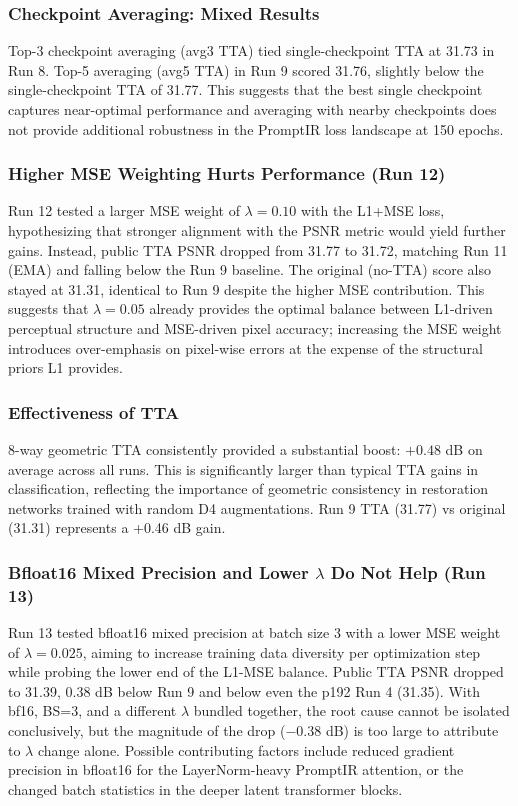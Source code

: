 \documentclass[12pt, a4paper]{article}
\begin{document}
\subsubsection{Checkpoint Averaging: Mixed Results}
Top-3 checkpoint averaging (avg3 TTA) tied single-checkpoint TTA at 31.73 in Run 8. Top-5 averaging (avg5 TTA) in Run 9 scored 31.76, slightly below the single-checkpoint TTA of 31.77. This suggests that the best single checkpoint captures near-optimal performance and averaging with nearby checkpoints does not provide additional robustness in the PromptIR loss landscape at 150 epochs.

\subsubsection{Higher MSE Weighting Hurts Performance (Run 12)}
Run 12 tested a larger MSE weight of $\lambda=0.10$ with the L1+MSE loss, hypothesizing that stronger alignment with the PSNR metric would yield further gains. Instead, public TTA PSNR dropped from 31.77 to 31.72, matching Run 11 (EMA) and falling below the Run 9 baseline. The original (no-TTA) score also stayed at 31.31, identical to Run 9 despite the higher MSE contribution. This suggests that $\lambda=0.05$ already provides the optimal balance between L1-driven perceptual structure and MSE-driven pixel accuracy; increasing the MSE weight introduces over-emphasis on pixel-wise errors at the expense of the structural priors L1 provides.

\subsubsection{Effectiveness of TTA}
8-way geometric TTA consistently provided a substantial boost: $+0.48$ dB on average across all runs. This is significantly larger than typical TTA gains in classification, reflecting the importance of geometric consistency in restoration networks trained with random D4 augmentations. Run 9 TTA (31.77) vs original (31.31) represents a +0.46 dB gain.

\subsubsection{Bfloat16 Mixed Precision and Lower $\lambda$ Do Not Help (Run 13)}
Run 13 tested bfloat16 mixed precision at batch size 3 with a lower MSE weight of $\lambda=0.025$, aiming to increase training data diversity per optimization step while probing the lower end of the L1-MSE balance. Public TTA PSNR dropped to 31.39, 0.38 dB below Run 9 and below even the p192 Run 4 (31.35). With bf16, BS=3, and a different $\lambda$ bundled together, the root cause cannot be isolated conclusively, but the magnitude of the drop ($-0.38$ dB) is too large to attribute to $\lambda$ change alone. Possible contributing factors include reduced gradient precision in bfloat16 for the LayerNorm-heavy PromptIR attention, or the changed batch statistics in the deeper latent transformer blocks.
\end{document}
